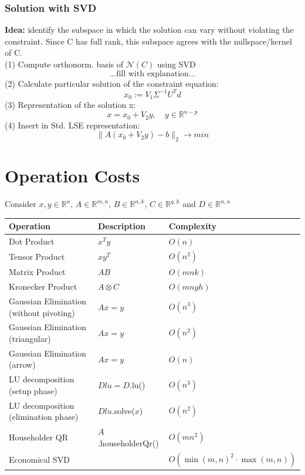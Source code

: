 \documentclass[12pt, a4paper]{article}
\newcommand{\R}{\mathbb{R}}
\begin{document}
\subsubsection{Solution with SVD}
\textbf{Idea:} identify the subspace in which the solution can vary without violating the constraint. Since C has full
rank, this subspace agrees with the nullspace/kernel of C.
\vspace{3mm} \\
(1) Compute orthonorm. basis of $\mathcal{N}(C)$ using SVD \\
\[ ... \text{fill with explanation} ... \]
(2) Calculate particular solution of the constraint equation: \\
\[ x_0 := V_1\Sigma^{-1}U^{T}d \] 
(3) Representation of the solution x: \\
\[ x =x_0 + V_2y, \quad  y \in \R^{n-p}\]
(4) Insert in Std. LSE representation:  \\
\[ \lVert A(x_0 + V_2y) - b\rVert_{2} \rightarrow min \]

\newpage
\section{Operation Costs}

Consider $x, y \in \mathbb{R}^n$, $A \in \mathbb{R}^{m,n}$, $B \in \mathbb{R}^{n,k}$, $C \in \mathbb{R}^{g,h}$ and $D \in \mathbb{R}^{n,n}$

\begin{table}[H]
\centering
\begin{tabular}{|l|l|l|}
\hline
\textbf{Operation} & \textbf{Description} & \textbf{Complexity} \\ \hline
Dot Product 	   & $x^Ty$ 				  & $O(n)$              \\ \hline
Tensor Product	   & $xy^T$               & $O(n^2)$			    \\ \hline
Matrix Product	   & $AB$             	  & $O(mnk)$			    \\ \hline
Kronecker Product  & $A \otimes C$        & $O(mngh)$			\\ \hline
Gaussian Elimination (without pivoting) & $Ax = y$        & $O(n^3)$			\\ \hline
Gaussian Elimination (triangular) & $Ax = y$        & $O(n^2)$			\\ \hline
Gaussian Elimination (arrow) & $Ax = y$        & $O(n)$			\\ \hline
LU decomposition (setup phase) & $Dlu = D$.lu()  & $O(n^3)$			\\ \hline
LU decomposition (elimination phase) & $Dlu$.solve($x$)  & $O(n^2)$			\\ \hline
Householder QR & $A$.householderQr()  & $O(mn^2)$			\\ \hline
Economical SVD & & $O(\min(m, n)^2\cdot\max(m,n))$ \\ \hline
\end{tabular}
\end{table}
\end{document}
